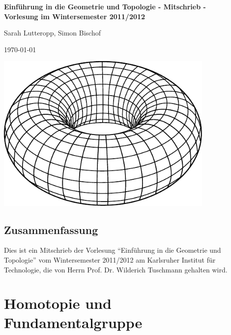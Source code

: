 \documentclass[a4paper,11pt,notitlepage]{report}
\begin{document}
\setcounter{chapter}{0}

\begin{titlepage}
	\begin{center}	
		\LARGE \textbf{{Einführung in die Geometrie und Topologie - Mitschrieb -} \\[5ex] 
    		{\Large Vorlesung im Wintersemester 2011/2012\\[5ex]}}
	\end{center}
	\begin{center}
		\Large Sarah Lutteropp, Simon Bischof
	\end{center}
	\begin{center}
		\today
	\end{center}
	\vspace{2cm}
	\begin{center}
		\includegraphics[width=0.8\textwidth]{torus2.pdf}
	\end{center}
\end{titlepage}
\setcounter{tocdepth}{1}
\tableofcontents

\section*{Zusammenfassung}
Dies ist ein Mitschrieb der Vorlesung “Einführung in die Geometrie und Topologie” vom Wintersemester 2011/2012 am Karlsruher Institut für Technologie, die von Herrn Prof. Dr. Wilderich Tuschmann gehalten wird.

\chapter{Homotopie und Fundamentalgruppe}
\setcounter{section}{-1}
\end{document}
